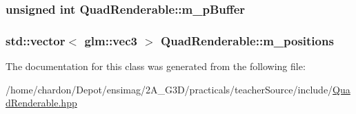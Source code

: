 \hypertarget{classQuadRenderable_a985335081fe25dd9556d86d6d168b5fe}{
\subsubsection[{m\+\_\+p\+Buffer}]{\setlength{\rightskip}{0pt plus 5cm}unsigned int Quad\+Renderable\+::m\+\_\+p\+Buffer\hspace{0.3cm}{\ttfamily [private]}}}\label{classQuadRenderable_a985335081fe25dd9556d86d6d168b5fe}
\hypertarget{classQuadRenderable_a98895c29eb360bfa5399856fd05808a3}{
\subsubsection[{m\+\_\+positions}]{\setlength{\rightskip}{0pt plus 5cm}std\+::vector$<$ glm\+::vec3 $>$ Quad\+Renderable\+::m\+\_\+positions\hspace{0.3cm}{\ttfamily [private]}}}\label{classQuadRenderable_a98895c29eb360bfa5399856fd05808a3}


The documentation for this class was generated from the following file\+:\begin{DoxyCompactItemize}
\item 
/home/chardon/\+Depot/ensimag/2\+A\+\_\+\+G3\+D/practicals/teacher\+Source/include/\hyperlink{QuadRenderable_8hpp}{Quad\+Renderable.\+hpp}\end{DoxyCompactItemize}
